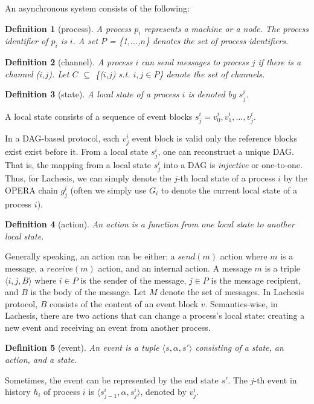\documentclass{article}
\newtheorem{defn}{Definition}[section]
\begin{document}
An asynchronous system consists of the following:
\begin{defn}[process]
	A process $p_i$ represents a machine or a node. The process identifier of $p_i$ is $i$. A set $P$ = \{1,...,$n$\} denotes the set of process identifiers.
\end{defn}
\begin{defn}[channel]
	A process $i$ can send messages to process $j$ if there is a channel ($i$,$j$). Let $C$ $\subseteq$ \{($i$,$j$) s.t. $i,j \in P$\} denote the set of channels.
\end{defn}
\begin{defn}[state]
	A local state of a process $i$ is denoted by $s_j^i$.
\end{defn}
A local state consists of a sequence of event blocks $s_j^i = v_0^i, v_1^i, \dots, v_j^i$. 

In a DAG-based protocol, each $v_j^i$ event block is valid only the reference blocks exist exist before it. From a local state $s_j^i$, one can reconstruct a unique DAG. That is, the mapping from a local state  $s_j^i$ into a DAG is \emph{injective} or one-to-one. 
Thus, for Lachesis, we can simply denote the $j$-th local state of a process $i$ by the OPERA chain $g_j^i$ (often we simply use $G_i$ to denote the current local state of a process $i$).

\begin{defn}[action]
	An action is a function from one local state to another local state.
\end{defn}
Generally speaking, an action can be either: a $send(m)$ action where $m$ is a message, a $receive(m)$ action, and an internal action. A message $m$ is a triple $\langle i,j,B \rangle$ where $i \in P$ is the sender of the message, $j \in P$ is the message recipient, and $B$ is the body of the message. Let $M$ denote the set of messages. 
In Lachesis protocol, $B$ consists of the content of an event block $v$. 
Semantics-wise, in Lachesis, there are  two actions that can change a process's local state: creating a new event and receiving an event from another process.

\begin{defn}[event] An event is a tuple $\langle  s,\alpha,s' \rangle$ consisting of a state, an action, and a state.
\end{defn}

Sometimes, the event can be represented by the end state $s'$.
The $j$-th event in history $h_i$ of process $i$ is $\langle  s_{j-1}^i,\alpha,s_j^i \rangle$, denoted by $v_j^i$.
\end{document}
